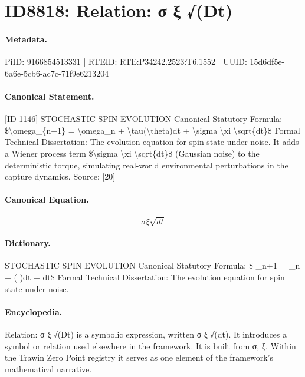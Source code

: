 \section*{ID8818: Relation: σ ξ √(Dt)}
\paragraph{Metadata.}
PiID: 9166854513331 | RTEID: RTE:P34242.2523:T6.1552 | UUID: 15d6df5e-6a6e-5cb6-ac7c-71f9e6213204

\paragraph{Canonical Statement.}
[ID 1146] STOCHASTIC SPIN EVOLUTION Canonical Statutory Formula: \$\textbackslash{}omega\_\{n+1\} = \textbackslash{}omega\_n + \textbackslash{}tau(\textbackslash{}theta)dt + \textbackslash{}sigma \textbackslash{}xi \textbackslash{}sqrt\{dt\}\$ Formal Technical Dissertation: The evolution equation for spin state under noise. It adds a Wiener process term \$\textbackslash{}sigma \textbackslash{}xi \textbackslash{}sqrt\{dt\}\$ (Gaussian noise) to the deterministic torque, simulating real-world environmental perturbations in the capture dynamics. Source: [20]

\paragraph{Canonical Equation.}
\[
\sigma \xi \sqrt{dt}
\]

\paragraph{Dictionary.}
STOCHASTIC SPIN EVOLUTION Canonical Statutory Formula: \$ \_n+1 = \_n + ( )dt + dt\$ Formal Technical Dissertation: The evolution equation for spin state under noise.

\paragraph{Encyclopedia.}
Relation: σ ξ √(Dt) is a symbolic expression, written σ ξ √(dt). It introduces a symbol or relation used elsewhere in the framework. It is built from σ, ξ. Within the Trawin Zero Point registry it serves as one element of the framework's mathematical narrative.
